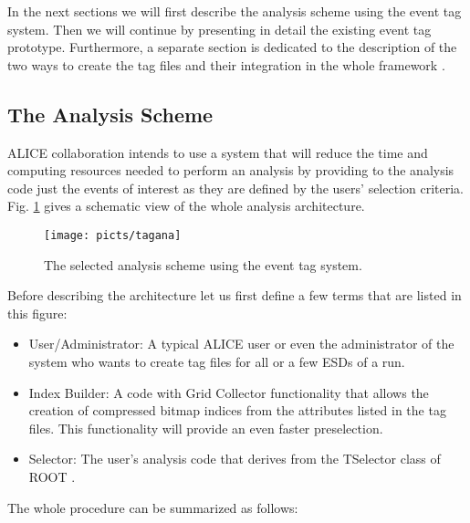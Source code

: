 \documentclass[12pt,a4paper,twoside]{article}
\begin{document}
{In the next sections we will first describe the analysis scheme using
the event tag system. Then we will continue by presenting in detail
the existing event tag prototype. Furthermore, a separate section is
dedicated to the description of the two ways to create the tag files
and their integration in the whole framework \cite{CompTDR}. 

\subsection{The Analysis Scheme}

ALICE collaboration intends to use a system that will reduce the time
and computing resources needed to perform an analysis by providing to
the analysis code just the events of interest as they are defined by
the users' selection criteria. Fig. \ref{analysis} gives a schematic
view of the whole analysis architecture.

\begin{figure}[ht!]
   \centering
   \texttt{[image: picts/tagana]}
   \caption{The selected analysis scheme using the event tag system. }
   \label{analysis}
\end{figure}

Before describing the architecture let us first define a few terms
that are listed in this figure:

\begin{itemize}

\item User/Administrator: A typical ALICE user or even the
  administrator of the system who wants to create tag files for all or
  a few ESDs \cite{CompTDR} of a run.


\item Index Builder: A code with Grid Collector \cite{GC1,GC2}
  functionality that allows the creation of compressed bitmap indices
  from the attributes listed in the tag files. This functionality will
  provide an even faster preselection.


\item Selector: The user's analysis code that derives from the
  TSelector class of ROOT \cite{RootSelector}.


\end{itemize}

The whole procedure can be summarized as follows:

}
\end{document}
